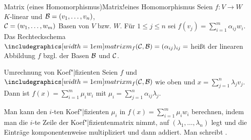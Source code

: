 \begin{xDef}{Matrix (eines Homomorphismus)}{Matrix!eines Homomorphismus}
    Seien $f: V \rightarrow W$ $K$-linear und
    $\mathcal{B} = (v_1, \ldots, v_n)$, \\
    $\mathcal{C} = (w_1, \ldots, w_m)$ Basen von $V$ bzw. $W$.
    Für $1 \le j \le n$ sei $f(v_j) = \sum_{i=1}^m \alpha_{ij} w_i$. \\
    Das Rechteckschema
    $\hommatrix{f}{C}{B} = (\alpha_{ij})_{ij} =$
     heißt  der linearen Abbildung $f$
    bzgl. der Basen $\mathcal{B}$ und $\mathcal{C}$.
\end{xDef}

\begin{Lemma}{Umrechnung von Koef"|fizienten}
    Seien $f$ und $\hommatrix{f}{C}{B}$ wie oben und
    $x = \sum_{j=1}^n \lambda_j v_j$.
    Dann ist $f(x) = \sum_{i=1}^m \mu_i w_i$ mit
    $\mu_i = \sum_{j=1}^n \alpha_{ij} \lambda_j$.
\end{Lemma}

\begin{Bem}
    Man kann den $i$-ten Koef"|fizienten $\mu_i$ in
    $f(x) = \sum_{i=1}^m \mu_i w_i$ berechnen, indem man die $i$-te Zeile
    der Koef"|fizientenmatrix nimmt, auf
    $(\lambda_1, \ldots, \lambda_n)$ legt und die Einträge komponentenweise
    multipliziert und dann addiert.
    Man schreibt
    .
\end{Bem}

